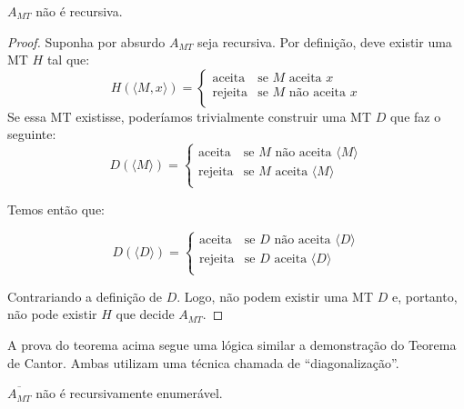 \begin{theorem}
  \label{teo:parada}
  $A_{MT}$ não é recursiva.
\end{theorem}
\begin{proof}
  Suponha por absurdo $A_{MT}$ seja recursiva.
  Por definição, deve existir uma MT $H$ tal que:
  \begin{displaymath}
    H(\langle M, x \rangle) = \left\{\begin{array}{cl}
                 \textrm{aceita} & \textrm{se $M$ aceita $x$}\\
                 \textrm{rejeita} & \textrm{se $M$ não aceita $x$}\\ 
               \end{array}\right.
  \end{displaymath}
  Se essa MT existisse, poderíamos trivialmente construir uma MT $D$ que faz o seguinte:
  \begin{displaymath}
    D(\langle M \rangle) =  \left\{\begin{array}{cl}
                \textrm{aceita} & \textrm{se $M$ não aceita $\langle M \rangle$}\\
                \textrm{rejeita} & \textrm{se $M$ aceita $\langle M \rangle$}\\ 
              \end{array}\right.
  \end{displaymath}

  Temos então que:

  \begin{displaymath}
    D(\langle D \rangle) = \left\{\begin{array}{cl}
               \textrm{aceita} & \textrm{se $D$ não aceita $\langle D \rangle$}\\
               \textrm{rejeita} & \textrm{se $D$ aceita $\langle D \rangle$}\\
             \end{array}\right.
  \end{displaymath}

  Contrariando a definição de $D$.
  Logo, não podem existir uma MT $D$ e, portanto, não pode existir $H$ que decide $A_{MT}$.
\end{proof}

A prova do teorema acima segue uma lógica similar a demonstração do Teorema de Cantor.
Ambas utilizam uma técnica chamada de ``diagonalização''.

\begin{corollary}
  $\overline{A_{MT}}$ não é recursivamente enumerável.
\end{corollary}

